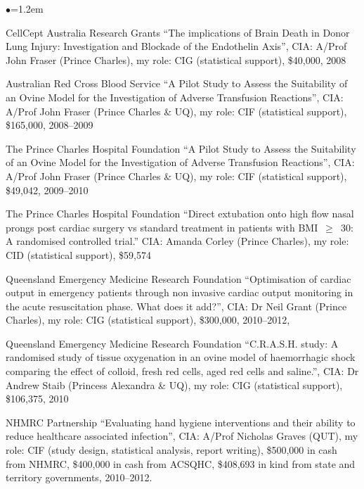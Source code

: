 \documentclass[a4paper,11pt]{article}
\renewcommand{\labelitemi}{$\bullet$}
\begin{document}
\begin{raggedright}
\begin{list}{\labelitemi}{\leftmargin=1.2em}
\item CellCept Australia Research Grants ``The implications of Brain Death in Donor Lung Injury: Investigation and Blockade of the Endothelin Axis'', CIA: A/Prof John Fraser (Prince Charles), my role: CIG (statistical support), \$40,000, 2008

\item Australian Red Cross Blood Service ``A Pilot Study to Assess the Suitability of an Ovine Model for the Investigation of Adverse Transfusion Reactions'', CIA: A/Prof John Fraser (Prince Charles \& UQ), my role: CIF (statistical support), \$165,000, 2008--2009

\item The Prince Charles Hospital Foundation ``A Pilot Study to Assess the Suitability of an Ovine Model for the Investigation of Adverse Transfusion Reactions'', CIA: A/Prof John Fraser (Prince Charles \& UQ), my role: CIF (statistical support), \$49,042, 2009--2010

\item The Prince Charles Hospital Foundation ``Direct extubation onto high flow nasal prongs post cardiac surgery vs standard treatment in patients with BMI~$\geq$~30: A randomised controlled trial.''  CIA: Amanda Corley (Prince Charles), my role: CID (statistical support), \$59,574

\item Queensland Emergency Medicine Research Foundation ``Optimisation of cardiac output in emergency patients through non invasive cardiac output monitoring in the acute resuscitation phase. What does it add?'', CIA: Dr Neil Grant (Prince Charles), my role: CIG (statistical support), \$300,000, 2010--2012,

\item Queensland Emergency Medicine Research Foundation ``C.R.A.S.H. study: A randomised study of tissue oxygenation in an ovine model of haemorrhagic shock comparing the effect of colloid, fresh red cells, aged red cells and saline.'', CIA: Dr Andrew Staib (Princess Alexandra \& UQ), my role: CIG (statistical support), \$106,375, 2010

\item NHMRC Partnership ``Evaluating hand hygiene interventions and their ability to reduce healthcare associated infection'', CIA: A/Prof Nicholas Graves (QUT), my role: CIF (study design, statistical analysis, report writing), \$500,000 in cash from NHMRC, \$400,000 in cash from ACSQHC, \$408,693 in kind from state and territory governments, 2010--2012.


\end{list}
\end{raggedright}
\end{document}
